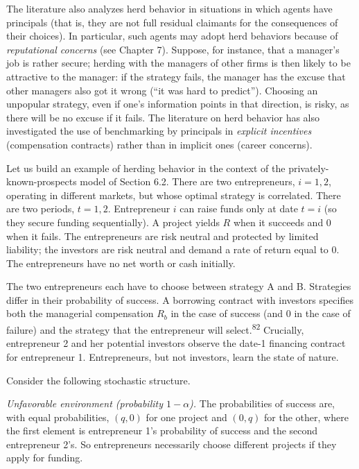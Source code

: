 \documentclass[11pt,a4paper]{article}
\begin{document}
The literature also analyzes herd behavior in situations in which agents have principals (that is,
they are not full residual claimants for the consequences of their choices). In particular, such
agents may adopt herd behaviors because of \emph{reputational concerns} (see Chapter 7). Suppose,
for instance, that a manager's job is rather secure; herding with the managers of other firms is
then likely to be attractive to the manager: if the strategy fails, the manager has the excuse that
other managers also got it wrong (``it was hard to predict''). Choosing an unpopular strategy, even
if one's information points in that direction, is risky, as there will be no excuse if it fails. The
literature on herd behavior has also investigated the use of benchmarking by principals in
\emph{explicit incentives} (compensation contracts) rather than in implicit ones (career concerns).

Let us build an example of herding behavior in the context of the privately-known-prospects model of
Section 6.2. There are two entrepreneurs, \(i = 1, 2\), operating in different markets, but whose
optimal strategy is correlated. There are two periods, \(t = 1, 2\). Entrepreneur \(i\) can raise
funds only at date \(t = i\) (so they secure funding sequentially). A project yields \(R\) when it
succeeds and 0 when it fails. The entrepreneurs are risk neutral and protected by limited liability;
the investors are risk neutral and demand a rate of return equal to 0. The entrepreneurs have no net
worth or cash initially.

The two entrepreneurs each have to choose between strategy A and B. Strategies differ in their
probability of success. A borrowing contract with investors specifies both the managerial
compensation \(R_b\) in the case of success (and 0 in the case of failure) and the strategy that the
entrepreneur will select.\textsuperscript{82} Crucially, entrepreneur 2 and her potential investors
observe the date-1 financing contract for entrepreneur 1. Entrepreneurs, but not investors, learn
the state of nature.

Consider the following stochastic structure.

\emph{Unfavorable environment (probability \(1 - \alpha\)).} The probabilities of success are, with
equal probabilities, \((q, 0)\) for one project and \((0, q)\) for the other, where the first
element is entrepreneur 1's probability of success and the second entrepreneur 2's. So entrepreneurs
necessarily choose different projects if they apply for funding.
\end{document}
